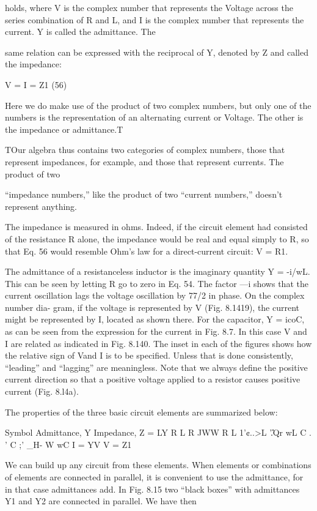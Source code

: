 holds, where V is the complex number that represents the Voltage
across the series combination of R and L, and I is the complex number
that represents the current. Y is called the admittance. The

same relation can be expressed with the reciprocal of Y, denoted by
Z and called the impedance:

\begin{equation}
\end{equation}
V =  I = Z1 (56)

Here we do make use of the product of two complex numbers, but
only one of the numbers is the representation of an alternating current
or Voltage. The other is the impedance or admittance.T

TOur algebra thus contains two categories of complex numbers, those that represent
impedances, for example, and those that represent currents. The product of two

``impedance numbers,'' like the product of two ``current numbers,'' doesn't represent
anything.

The impedance is measured in ohms. Indeed, if the circuit element
had consisted of the resistance R alone, the impedance would
be real and equal simply to R, so that Eq. 56 would resemble Ohm's
law for a direct-current circuit: V = R1.

The admittance of a resistanceless inductor is the imaginary
quantity Y = -i/wL. This can be seen by letting R go to zero in
Eq. 54. The factor ---i shows that the current oscillation lags the
voltage oscillation by 77/2 in phase. On the complex number dia-
gram, if the voltage is represented by V (Fig. 8.1419), the current
might be represented by I, located as shown there. For the capacitor,
Y = icoC, as can be seen from the expression for the current in
Fig. 8.7. In this case V and I are related as indicated in Fig. 8.140.
The inset in each of the figures shows how the relative sign of Vand I
is to be specified. Unless that is done consistently, ``leading'' and
``lagging'' are meaningless. Note that we always define the positive
current direction so that a positive voltage applied to a resistor causes
positive current (Fig. 8.l4a).

The properties of the three basic circuit elements are summarized
below:

Symbol Admittance, Y Impedance, Z = LY
R L R
JWW R
L  1'¢..>L
'\U.Qr wL
C .
' C ;'
_H- W wC
I = YV V = Z1

We can build up any circuit from these elements. When elements
or combinations of elements are connected in parallel, it is convenient
to use the admittance, for in that case admittances add. In Fig. 8.15
two ``black boxes'' with admittances Y1 and Y2 are connected in
parallel. We have then

